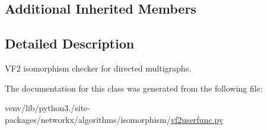 \subsection*{Additional Inherited Members}


\subsection{Detailed Description}
\begin{DoxyVerb}VF2 isomorphism checker for directed multigraphs.\end{DoxyVerb}
 

The documentation for this class was generated from the following file\+:\begin{DoxyCompactItemize}
\item 
venv/lib/python3./site-\/packages/networkx/algorithms/isomorphism/\hyperlink{vf2userfunc_8py}{vf2userfunc.\+py}\end{DoxyCompactItemize}
